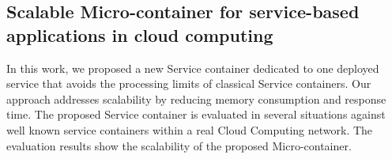 \documentclass[11pt,a4paper,sans]{moderncv}   %
\begin{document}
\subsection{Scalable Micro-container for service-based applications in cloud computing}
In this work, we proposed a new Service container dedicated to one deployed service that avoids 
the processing limits of classical Service containers. Our approach addresses scalability by reducing memory consumption and response time. The 
proposed Service container is evaluated in several situations against well known service containers within a real Cloud Computing network. 
The evaluation results show the scalability of the proposed Micro-container.
\end{document}
